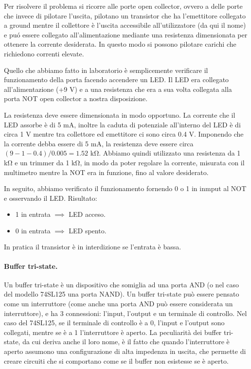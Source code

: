 Per risolvere il problema si ricorre alle porte open collector, ovvero a delle porte
che invece di pilotare l'uscita, pilotano un transistor che ha l'emettitore
collegato a ground mentre il collettore è l'uscita accessibile all'utilizzatore (da qui il nome)
e puó essere collegato all'alimentazione mediante una resistenza dimensionata per
ottenere la corrente desiderata. In questo modo si possono pilotare carichi che richiedono
correnti elevate.

Quello che abbiamo fatto in laboratorio è semplicemente verificare il funzionamento
della porta facendo accendere un LED. Il LED era collegato all'alimentazione (+9 V) e
a una resistenza che era a sua volta collegata alla porta NOT open collector a nostra disposizione.

La resistenza deve essere dimensionata in modo opportuno. La corrente che il LED assorbe è di 5 mA,
inoltre la caduta di potenziale all'interno del LED è di circa 1 V mentre tra collettore
ed emettitore ci sono circa 0.4 V. Imponendo che la corrente debba essere di 5 mA, la resistenza deve essere
circa $(9-1-0.4)/0.005 = 1.52$ \si{\kilo\ohm}. Abbiamo quindi utilizzato una resistenza da 1 \si{\kilo\ohm}
e un trimmer da 1 \si{\kilo\ohm}, in modo da poter regolare la corrente, misurata con il multimetro
mentre la NOT era in funzione, fino al valore desiderato.

In seguito, abbiamo verificato il funzionamento fornendo 0 o 1 in inmput al NOT e osservando il LED.
Risultato:

\begin{itemize}
    \item{1 in entrata $\implies$ LED acceso.}
    \item{0 in entrata $\implies$ LED spento.}
\end{itemize}

In pratica il transistor è in interdizione se l'entrata è bassa.

\paragraph{Buffer tri-state.}

Un buffer tri-state è un dispositivo che somiglia ad una porta AND (o nel caso del modello 74SL125 una porta NAND).
Un buffer tri-state può essere pensato come un interruttore (come anche una porta AND può essere
considerata un interruttore), e ha 3 connessioni: l'input, l'output e un terminale di controllo.
Nel caso del 74SL125, se il terminale di controllo è a 0, l'input e l'output sono collegati, mentre se è a 1
l'interruttore è aperto. La peculiarità dei buffer tri-state, da cui deriva anche il loro nome, è il fatto
che quando l'interruttore è aperto assumono una configurazione di alta impedenza in uscita, che permette
di creare circuiti che si comportano come se il buffer non esistesse se è aperto.

